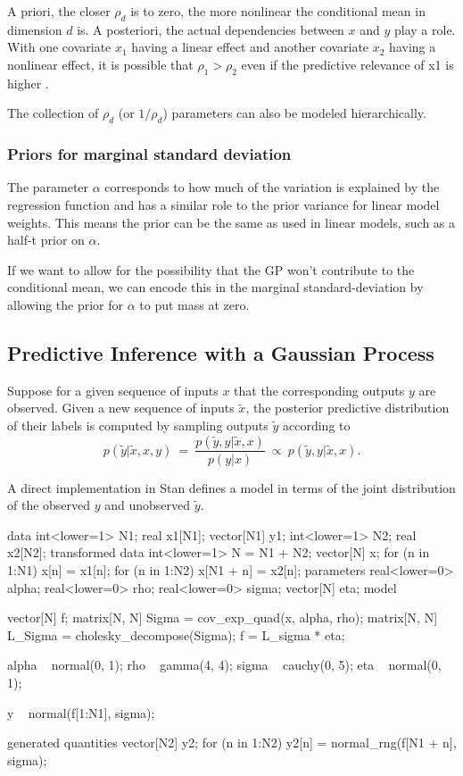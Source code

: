 A priori, the closer $\rho_d$ is to zero, the more nonlinear the
conditional mean in dimension $d$ is.  A posteriori, the actual dependencies
between $x$ and $y$ play a role.  With one covariate $x_1$ having a
linear effect and another covariate $x_2$ having a nonlinear effect,
it is possible that $\rho_1 > \rho_2$ even if the predictive relevance
of x1 is higher \cite[page~80]{RasmussenWilliams:2006}.

The collection of $\rho_d$ (or $1/\rho_d$) parameters can also be
modeled hierarchically.

\subsubsection{Priors for marginal standard deviation}

The parameter $\alpha$ corresponds to how much of the variation is
explained by the regression function and has a similar role to the
prior variance for linear model weights.  This means the prior can be
the same as used in linear models, such as a half-t prior on $\alpha$.

If we want to allow for the possibility that the GP won't contribute to the
conditional mean, we can encode this in the marginal standard-deviation by
allowing the prior for $\alpha$ to put mass at zero.

\subsection{Predictive Inference with a Gaussian Process}

Suppose for a given sequence of inputs $x$ that the corresponding
outputs $y$ are observed.  Given a new sequence of inputs $\tilde{x}$,
the posterior predictive distribution of their labels is computed by
sampling outputs $\tilde{y}$ according to
\[
p(\tilde{y}|\tilde{x},x,y)
\ = \
\frac{p(\tilde{y}, y|\tilde{x},x)}
     {p(y|x)}
\ \propto \
p(\tilde{y}, y|\tilde{x},x).
\]

A direct implementation in Stan defines a model in terms of the
joint distribution of the observed $y$ and unobserved $\tilde{y}$.
%
\begin{stancode}
data {
  int<lower=1> N1;     
  real x1[N1]; 
  vector[N1] y1;
  int<lower=1> N2;
  real x2[N2];
}
transformed data {
  int<lower=1> N = N1 + N2;
  vector[N] x;
  for (n in 1:N1) x[n] = x1[n];
  for (n in 1:N2) x[N1 + n] = x2[n];
}
parameters {
  real<lower=0> alpha;
  real<lower=0> rho;
  real<lower=0> sigma;
  vector[N] eta;
}
model {
  vector[N] f;
  {
    matrix[N, N] Sigma = cov_exp_quad(x, alpha, rho);
    matrix[N, N] L_Sigma = cholesky_decompose(Sigma);
    f = L_sigma * eta;
  }

  alpha ~ normal(0, 1);
  rho ~ gamma(4, 4);
  sigma ~ cauchy(0, 5);
  eta ~ normal(0, 1);

  y ~ normal(f[1:N1], sigma);
}
generated quantities {
  vector[N2] y2;
  for (n in 1:N2)
    y2[n] = normal_rng(f[N1 + n], sigma);
}
\end{stancode}
%

